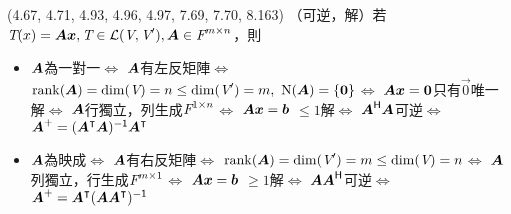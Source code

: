 \item \begin{theorem}{(4.67, 4.71, 4.93, 4.96, 4.97, 7.69, 7.70, 8.163)} （可逆，解）若$\textit{T}(x) = \boldsymbol{A}\boldsymbol{x}, \textit{T} \in \mathcal{L}(\textit{V}, \textit{V}'), \boldsymbol{A} \in \textit{F}^{m \times n}$，則
	\begin{itemize}
		\item $\boldsymbol{A}$為一對一$\iff$
		$\boldsymbol{A}$有左反矩陣$\iff$
		$\operatorname{rank}(\boldsymbol{A}) = \dim(\textit{V}) = n \le \dim(\textit{V}') = m, \ \operatorname{N}(\boldsymbol{A}) = \{\boldsymbol{0}\}$$\iff$
		$\boldsymbol{A}\boldsymbol{x} = \boldsymbol{0}$只有$\vec{0}$唯一解$\iff$
		$\boldsymbol{A}$行獨立，列生成$\textit{F}^{1 \times n}$$\iff$
		$\boldsymbol{A}\boldsymbol{x} = \boldsymbol{b}$ $\le 1$解$\iff$
		$\boldsymbol{A}^{\mathsf{H}} \boldsymbol{A}$可逆$\iff$
		$\boldsymbol{A}^+ = (\boldsymbol{A}^\intercal\boldsymbol{A})^{\mathsf{-1}}\boldsymbol{A}^\intercal$
		\item $\boldsymbol{A}$為映成$\iff$
		$\boldsymbol{A}$有右反矩陣$\iff$
		$\operatorname{rank}(\boldsymbol{A}) = \dim(\textit{V}') = m \le \dim(\textit{V}) = n$$\iff$
		$\boldsymbol{A}$列獨立，行生成$\textit{F}^{m \times 1}$$\iff$
		$\boldsymbol{A}\boldsymbol{x} = \boldsymbol{b}$ $\ge 1$解$\iff$
		$\boldsymbol{A}\boldsymbol{A}^{\mathsf{H}}$可逆$\iff$
		$\boldsymbol{A}^+ = \boldsymbol{A}^\intercal(\boldsymbol{A}\boldsymbol{A}^\intercal)^{\mathsf{-1}}$
	\end{itemize}
\end{theorem}
